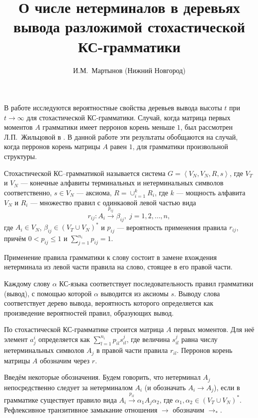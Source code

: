 \documentclass{article}
\title{О числе нетерминалов в деревьях вывода разложимой стохастической КС-грамматики}
\author{И.М.~Мартынов (Нижний Новгород)}
\date{}
\begin{document}
	

\maketitle

В работе исследуются вероятностные свойства деревьев вывода высоты $t$ при $t \rightarrow \infty$ для стохастической КС-грамматики. Случай, когда матрица первых моментов $A$ грамматики имеет перронов корень меньше $1$, был рассмотрен Л.П.~Жильцовой в \cite{lp-zakonom}. В данной работе эти результаты обобщаются на случай, когда перронов корень матрицы $A$ равен $1$, для грамматики произвольной структуры.

Стохастической КС--грамматикой называется система $G = \left< V_N, V_N, R, s \right>$, где $V_T$ и $V_N$ --- конечные алфавиты терминальных и нетерминальных символов соответственно, $s \in V_N$ --- аксиома, $R = \cup_{i = 1}^k R_i$, где $k$ --- мощность алфавита $V_N$ и $R_i$ --- множество правил с одинкаовой левой частью вида
\begin{equation*}
    r_{ij} : A_i \xrightarrow{p_{ij}} \beta_{ij},\;j = 1,2,\ldots,n,
\end{equation*}
где $A_i \in V_N$, $\beta_{ij} \in (V_T \cup V_N)^*$ и $p_{ij}$ --- вероятность применения правила $r_{ij}$, причём $0 < p_{ij} \leqslant 1$ и $\sum_{j = 1}^{n_i} p_{ij} = 1$.

Применение правила грамматики к слову состоит в замене вхождения нетерминала из левой части правила на слово, стоящее в его правой части.

Каждому слову $\alpha$ КС-языка соответствует последовательность правил грамматики (вывод), с помощью которой $\alpha$ выводится из аксиомы $s$. Выводу слова соответствует дерево вывода, вероятность которого определяется как произведение вероятностей правил, образующих вывод.

По стохастической КС-грамматике строится матрица $A$ первых моментов. Для неё элемент $a^i_j$ определяется как $\sum_{l = 1}^{n_i} p_{il} s_{il}^j$, где величина $s_{il}^j$ равна числу нетерминальных символов $A_j$ в правой части правила $r_{il}$. Перронов корень матрицы $A$ обозначим через $r$.

Введём некоторые обозначения. Будем говорить, что нетерминал $A_j$ непосредственно следует за нетерминалом $A_i$ (и обозначать $A_i \rightarrow A_j$), если в грамматике существует правило вида $A_i \xrightarrow{p_{il}} \alpha_1 A_j \alpha_2$, где $\alpha_1, \alpha_2 \in (V_T \cup V_N)^*$. Рефлексивное транзитивное замыкание отношения $\rightarrow$ обозначим $\rightarrow_*$.
\end{document}
